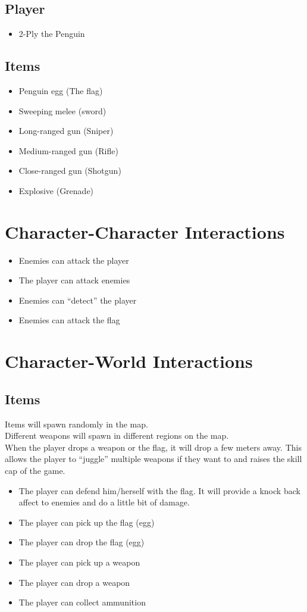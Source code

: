 \documentclass{article}
\begin{document}
\subsection{Player}
\begin{itemize}
\item 2-Ply the Penguin
\end{itemize}

\subsection{Items}
\begin{itemize}
\item Penguin egg (The flag)
\item Sweeping melee (sword)
\item Long-ranged gun (Sniper)
\item Medium-ranged gun (Rifle)
\item Close-ranged gun (Shotgun)
\item Explosive (Grenade)
\end{itemize}

\section{Character-Character Interactions}
\begin{itemize}
\item Enemies can attack the player
\item The player can attack enemies
\item Enemies can ``detect'' the player
\item Enemies can attack the flag

\end{itemize}
\section{Character-World Interactions}
\subsection{Items}
Items will spawn randomly in the map.\\
Different weapons will spawn in different regions on the map.\\
When the player drops a weapon or the flag, it will drop a few meters away. This allows the player to ``juggle'' multiple weapons if they want to and raises the skill cap of the game.
\begin{itemize}
\item The player can defend him/herself with the flag. It will provide a knock back affect to enemies and do a little bit of damage.
\item The player can pick up the flag (egg)
\item The player can drop the flag (egg)
\item The player can pick up a weapon
\item The player can drop a weapon
\item The player can collect ammunition

\end{itemize}
\end{document}
